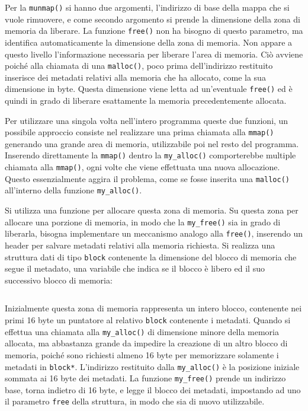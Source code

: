 \documentclass{article}
\numberwithin{equation}{subsection}
\begin{document}
Per la \verb|munmap()| si hanno due argomenti, l'indirizzo di base della mappa che si vuole 
rimuovere, e come secondo argomento si prende la dimensione della zona di memoria da liberare. La funzione \verb|free()| non ha bisogno di questo parametro, ma identifica automaticamente la 
dimensione della zona di memoria. Non appare a questo livello l'informazione necessaria per liberare l'area di memoria. 
Ciò avviene poiché alla chiamata di una \verb|malloc()|, poco prima dell'indirizzo restituito 
inserisce dei metadati relativi alla memoria che ha allocato, come la sua dimensione in byte. 
Questa dimensione viene letta ad un'eventuale \verb|free()| ed è quindi in grado di liberare 
esattamente la memoria precedentemente allocata. 

Per utilizzare una singola volta nell'intero programma queste due funzioni, un possibile approccio consiste nel realizzare una prima chiamata alla \verb|mmap()| generando una grande 
area di memoria, utilizzabile poi nel resto del programma. Inserendo direttamente la \verb|mmap()| dentro la \verb|my_alloc()| comporterebbe multiple chiamata alla \verb|mmap()|, ogni volte 
che viene effettuata una nuova allocazione. Questo essenzialmente aggira il problema, come se 
fosse inserita una \verb|malloc()| all'interno della funzione \verb|my_alloc()|. 


Si utilizza una funzione per allocare questa zona di memoria. Su questa zona per allocare 
una porzione di memoria, in modo che la \verb|my_free()| sia in grado di liberarla, bisogna 
implementare un meccanismo analogo alla \verb|free()|, inserendo un header per salvare metadati 
relativi alla memoria richiesta. Si realizza una struttura dati di tipo \verb|block| contenente la dimensione del blocco di memoria che segue il metadato, una variabile che 
indica se il blocco è libero ed il suo successivo blocco di memoria:
\inputminted[firstline=21,lastline=26]{c}{./Esercitazione del 19-11-24/domanda4.c}
Inizialmente questa zona di memoria rappresenta un intero blocco, contenente nei primi 16 byte un puntatore al relativo \verb|block| contenente i metadati. 
Quando si effettua una chiamata alla \verb|my_alloc()| di dimensione minore della memoria 
allocata, ma abbastanza grande da impedire la creazione di un altro blocco di memoria, poiché sono richiesti almeno 16 byte per memorizzare solamente i metadati in \verb|block*|. L'indirizzo restituito dalla \verb|my_alloc()| è la posizione iniziale sommata ai 16 byte dei metadati. 
La funzione \verb|my_free()| prende un indirizzo base, torna indietro di 16 byte, e legge il 
blocco dei metadati, impostando ad uno il parametro \verb|free| della struttura, in modo che sia 
di nuovo utilizzabile. 
\end{document}

